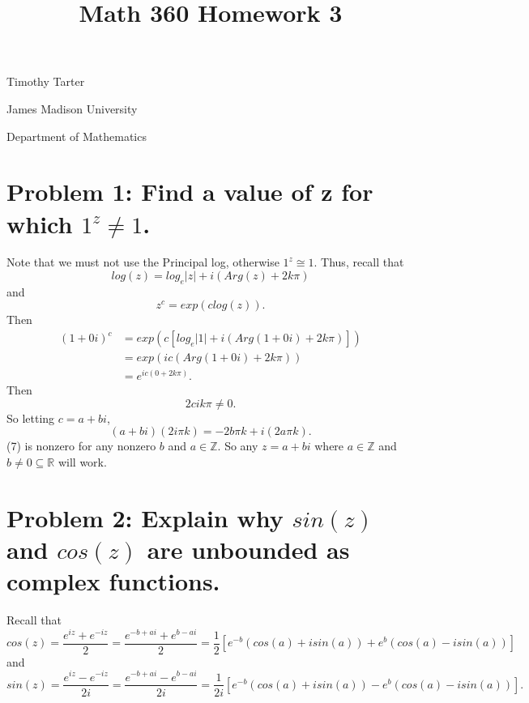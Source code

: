\documentclass[12 pt]{article}        	%
\title{Math 360 Homework 3}
\newcommand{\z}{\mathbb Z}
\newcommand{\real}{\mathbb R}
\begin{document}
\maketitle
\begin{center}
    Timothy Tarter

    James Madison University

    Department of Mathematics
\end{center}

\section*{Problem 1: Find a value of z for which $1^z \neq 1$.}
Note that we must not use the Principal log, otherwise $1^z \cong 1$. Thus, recall that 
\begin{equation}
    log(z) = log_e|z|+i(Arg(z)+2k\pi)
\end{equation}
and
\begin{equation}
    z^c = exp(clog(z)).
\end{equation}
Then
\begin{align}
    (1+0i)^c &= exp(c[log_e|1|+i(Arg(1+0i)+2k\pi)])\\
    &=exp(ic(Arg(1+0i)+2k\pi))\\
    &=e^{ic(0+2k\pi)}.
\end{align}
Then
\begin{equation}
    2cik\pi \neq 0.
\end{equation}
So letting $c=a+bi$,
\begin{equation}
    (a+bi)(2i\pi k) = -2b\pi k+i(2a\pi k).
\end{equation}
(7) is nonzero for any nonzero $b$ and $a \in \z$. So any $z = a+bi$ where $a\in \z$ and $b \neq 0 \subseteq \real$ will work. 


\section*{Problem 2: Explain why $sin(z)$ and $cos(z)$ are unbounded as complex functions.}
Recall that 
\begin{equation}
    cos(z) = \frac{e^{iz}+e^{-iz}}{2}= \frac{e^{-b+ai}+e^{b-ai}}{2}=\frac{1}{2}\left[ e^{-b}(cos(a)+isin(a)) + e^b (cos(a) - isin(a)) \right]
\end{equation}
and
\begin{equation}
    sin(z) = \frac{e^{iz}-e^{-iz}}{2i} = \frac{e^{-b+ai}-e^{b-ai}}{2i}=  \frac{1}{2i}\left[ e^{-b}(cos(a)+isin(a)) - e^b (cos(a) - isin(a)) \right].
\end{equation}
\end{document}
